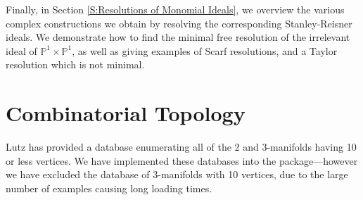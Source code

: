 \documentclass[12pt,leqno]{amsart}
\theoremstyle{definition}
\newcommand{\PP}{\ensuremath{\mathbb{P}}}
\begin{document}
Finally, in Section \ref{S:Resolutions of Monomial Ideals}, we overview the various complex constructions we obtain by resolving the corresponding Stanley-Reisner ideals. We demonstrate how to find the minimal free resolution of the irrelevant ideal of $\PP^1 \times \PP^1$, as well as giving examples of Scarf resolutions, and a Taylor resolution which is not minimal.

\section{Combinatorial Topology}
\label{S:Combinatorial Topology}

Lutz has provided a database enumerating all of the 2 and 3-manifolds having 10 or less vertices. We have implemented these databases into the package---however we have excluded the database of 3-manifolds with 10 vertices, due to the large number of examples causing long loading times.
\end{document}
